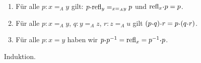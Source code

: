 \begin{lemma}
\begin{enumerate}
\item Für alle $ p:x=_Ay$ gilt: $ p\kon\refl_y=_{x=_Ay} p$ und $\refl_x\kon p= p$.
\item Für alle $ p:x=_Ay$, $ q:y=_Az$, $ r:z=_Au$ gilt
   $( p\kon q)\kon r= p\kon( q\kon r)$.
\item Für alle $ p:x=y$ haben wir $ p\kon p^{-1}=\refl_x= p^{-1}\kon p$.
\end{enumerate}
\end{lemma}
\begin{beweis}
  Induktion.
\end{beweis}

